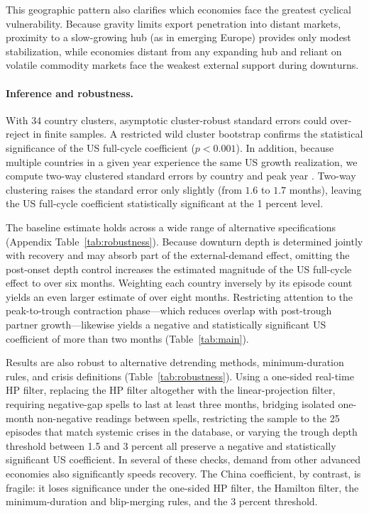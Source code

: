 \documentclass[12pt, a4paper]{article}
\begin{document}
This geographic pattern also clarifies which economies face the greatest cyclical vulnerability. Because gravity limits export penetration into distant markets, proximity to a slow-growing hub (as in emerging Europe) provides only modest stabilization, while economies distant from any expanding hub and reliant on volatile commodity markets face the weakest external support during downturns.

\paragraph{Inference and robustness.} With 34 country clusters, asymptotic cluster-robust standard errors could over-reject in finite samples. A restricted wild cluster bootstrap \citep{cameron2008} confirms the statistical significance of the US full-cycle coefficient ($p<0.001$). In addition, because multiple countries in a given year experience the same US growth realization, we compute two-way clustered standard errors by country and peak year \citep{cameron2011}. Two-way clustering raises the standard error only slightly (from $1.6$ to $1.7$ months), leaving the US full-cycle coefficient statistically significant at the 1 percent level.

The baseline estimate holds across a wide range of alternative specifications (Appendix Table~\ref{tab:robustness}). Because downturn depth is determined jointly with recovery and may absorb part of the external-demand effect, omitting the post-onset depth control increases the estimated magnitude of the US full-cycle effect to over six months. Weighting each country inversely by its episode count yields an even larger estimate of over eight months. Restricting attention to the peak-to-trough contraction phase---which reduces overlap with post-trough partner growth---likewise yields a negative and statistically significant US coefficient of more than two months (Table~\ref{tab:main}).

Results are also robust to alternative detrending methods, minimum-duration rules, and crisis definitions (Table~\ref{tab:robustness}). Using a one-sided real-time HP filter, replacing the HP filter altogether with the \citet{hamilton2018} linear-projection filter, requiring negative-gap spells to last at least three months, bridging isolated one-month non-negative readings between spells, restricting the sample to the 25 episodes that match systemic crises in the \citet{laeven2020} database, or varying the trough depth threshold between 1.5 and 3 percent all preserve a negative and statistically significant US coefficient. In several of these checks, demand from other advanced economies also significantly speeds recovery. The China coefficient, by contrast, is fragile: it loses significance under the one-sided HP filter, the Hamilton filter, the minimum-duration and blip-merging rules, and the 3 percent threshold.
\end{document}
